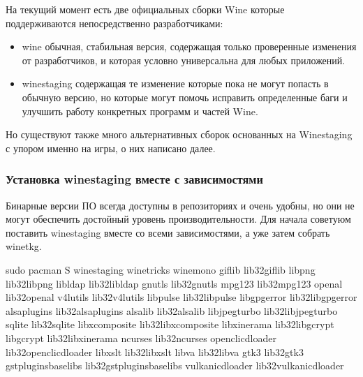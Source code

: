 \documentclass[letterpaper,10pt,russian,openany]{sphinxmanual}
\begin{document}
\sphinxAtStartPar
На текущий момент есть две официальных сборки Wine которые поддерживаются непосредственно разработчиками:
\begin{itemize}
\item {} 
\sphinxAtStartPar
wine \sphinxhyphen{} обычная, стабильная версия, содержащая только проверенные изменения от разработчиков, и которая условно универсальна
для любых приложений.

\item {} 
\sphinxAtStartPar
wine\sphinxhyphen{}staging \sphinxhyphen{} содержащая те изменение которые пока не могут попасть в обычную версию, но которые могут помочь
исправить определенные баги и улучшить работу конкретных программ и частей Wine.

\end{itemize}

\sphinxAtStartPar
Но существуют также много альтернативных сборок основанных на Wine\sphinxhyphen{}staging с упором именно на игры, о них написано далее.

\ignorespaces 

\subsubsection{Установка wine\sphinxhyphen{}staging вместе с зависимостями}
\label{\detokenize{source/linux-gaming:wine-staging}}\label{\detokenize{source/linux-gaming:index-3}}\label{\detokenize{source/linux-gaming:id3}}
\sphinxAtStartPar
Бинарные версии ПО всегда доступны в репозиториях и очень удобны, но они не могут обеспечить достойный уровень производительности.
Для начала советуюм поставить wine\sphinxhyphen{}staging вместе со всеми зависимостями, а уже затем собрать wine\sphinxhyphen{}tkg.

\begin{sphinxVerbatim}[commandchars=\\\{\}]
sudo pacman \PYGZhy{}S wine\PYGZhy{}staging winetricks wine\PYGZhy{}mono giflib lib32\PYGZhy{}giflib libpng lib32\PYGZhy{}libpng libldap lib32\PYGZhy{}libldap gnutls lib32\PYGZhy{}gnutls mpg123 lib32\PYGZhy{}mpg123 openal lib32\PYGZhy{}openal v4l\PYGZhy{}utils lib32\PYGZhy{}v4l\PYGZhy{}utils libpulse lib32\PYGZhy{}libpulse libgpg\PYGZhy{}error lib32\PYGZhy{}libgpg\PYGZhy{}error alsa\PYGZhy{}plugins lib32\PYGZhy{}alsa\PYGZhy{}plugins alsa\PYGZhy{}lib lib32\PYGZhy{}alsa\PYGZhy{}lib libjpeg\PYGZhy{}turbo lib32\PYGZhy{}libjpeg\PYGZhy{}turbo sqlite lib32\PYGZhy{}sqlite libxcomposite lib32\PYGZhy{}libxcomposite libxinerama lib32\PYGZhy{}libgcrypt libgcrypt lib32\PYGZhy{}libxinerama ncurses lib32\PYGZhy{}ncurses opencl\PYGZhy{}icd\PYGZhy{}loader lib32\PYGZhy{}opencl\PYGZhy{}icd\PYGZhy{}loader libxslt lib32\PYGZhy{}libxslt libva lib32\PYGZhy{}libva gtk3 lib32\PYGZhy{}gtk3 gst\PYGZhy{}plugins\PYGZhy{}base\PYGZhy{}libs lib32\PYGZhy{}gst\PYGZhy{}plugins\PYGZhy{}base\PYGZhy{}libs vulkan\PYGZhy{}icd\PYGZhy{}loader lib32\PYGZhy{}vulkan\PYGZhy{}icd\PYGZhy{}loader
\end{sphinxVerbatim}
\end{document}
